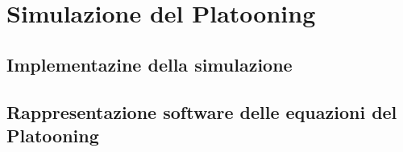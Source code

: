 \section{Simulazione del Platooning}
\fancyhead{}

\subsection{Implementazine della simulazione}

\subsection{Rappresentazione software delle equazioni del Platooning}